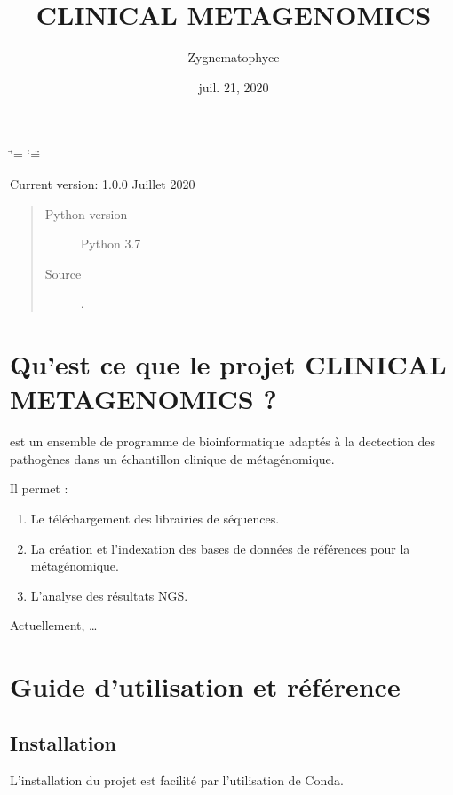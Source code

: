 \documentclass[letterpaper,10pt,french]{sphinxmanual}
\title{CLINICAL METAGENOMICS}
\date{juil. 21, 2020}
\author{Zygnematophyce}
\begin{document}
\ifdefined\shorthandoff
  \ifnum\catcode`\=\string=\active\shorthandoff{=}\fi
  \ifnum\catcode`\"=\active{}\fi
\fi

\pagestyle{empty}
\sphinxmaketitle
\pagestyle{plain}
\sphinxtableofcontents
\pagestyle{normal}
\label{\detokenize{index::doc}}


Current version: 1.0.0 Juillet 2020
\begin{quote}\begin{description}
\item[{Python version}] \leavevmode
Python 3.7

\item[{Source}] \leavevmode
{}.

\end{description}\end{quote}


\chapter{Qu’est ce que le projet CLINICAL METAGENOMICS ?}
\label{\detokenize{index:qu-est-ce-que-le-projet-clinical-metagenomics}}
 est un ensemble de programme de bio\sphinxhyphen{}informatique adaptés à la dectection des pathogènes dans un échantillon clinique de métagénomique.

Il permet :
\begin{enumerate}
%
\item {} 
Le téléchargement des librairies de séquences.

\item {} 
La création et l’indexation des bases de données de références pour la métagénomique.

\item {} 
L’analyse des résultats NGS.

\end{enumerate}

Actuellement, …


\chapter{Guide d’utilisation et référence}
\label{\detokenize{index:guide-d-utilisation-et-reference}}

\section{Installation}
\label{\detokenize{installation_conda_environnement:installation}}\label{\detokenize{installation_conda_environnement::doc}}
L’installation du projet est facilité par l’utilisation de Conda.
\end{document}

